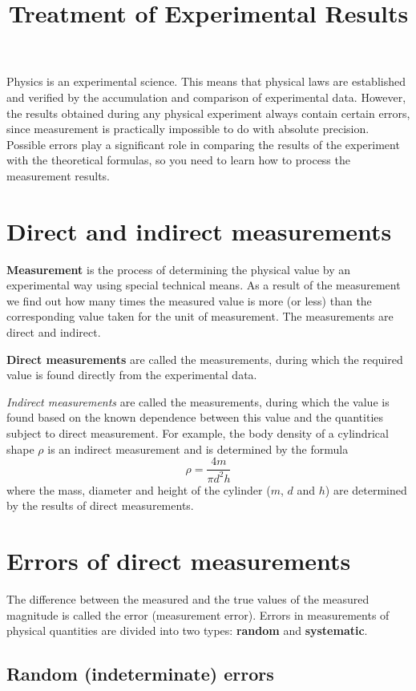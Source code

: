 \documentclass{LabWorkEng}
\title{Treatment of Experimental Results}
\begin{document}
\makeatletter
\@maketitle
\makeatother

Physics is an experimental science. This means that physical laws are established and verified by the accumulation and comparison of experimental data. However, the results obtained during any physical experiment always contain certain errors, since measurement is practically impossible to do with absolute precision. Possible errors play a significant role in comparing the results of the experiment with the theoretical formulas, so you need to learn how to process the measurement results.

\section{Direct and indirect measurements}

\textbf{Measurement} is the process of determining the physical value by an experimental way using special technical means. As a result of the measurement we find out how many times the measured value is more (or less) than the corresponding value taken for the unit of measurement. The measurements are direct and indirect.

\textbf{Direct measurements} are called the measurements, during which the required value is found directly from the experimental data.

\emph{Indirect measurements} are called the measurements, during which the value is found based on the known dependence between this value and the quantities subject to direct measurement. For example, the body density of a cylindrical shape $\rho$ is an indirect measurement and is determined by the formula
\begin{equation*}
	\rho  = \frac{{4m}}{{\pi {d^2}h}}
\end{equation*}
where the mass, diameter and height of the cylinder ($m$, $d$ and $h$) are determined by the results of direct measurements.

\section{Errors of direct measurements}
The difference between the measured and the true values of the measured magnitude is called the error (measurement error). Errors in measurements of physical quantities are divided into two types: \textbf{random} and \textbf{systematic}.


\subsection{Random (indeterminate) errors}
\end{document}
